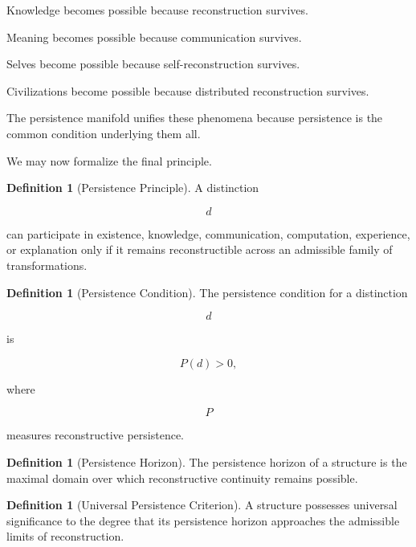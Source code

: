\documentclass[12pt,oneside]{article}
\theoremstyle{definition}
\newtheorem{definition}[theorem]{Definition} \newtheorem{axiom}[theorem]{Axiom} \newtheorem{remark}[theorem]{Remark} \newtheorem{example}[theorem]{Example}
\begin{document}
Knowledge becomes possible because reconstruction survives.

Meaning becomes possible because communication survives.

Selves become possible because self-reconstruction survives.

Civilizations become possible because distributed reconstruction survives.

The persistence manifold unifies these phenomena because persistence is the common condition underlying them all.

We may now formalize the final principle.

\begin{definition}[Persistence Principle]

A distinction

\[
d
\]

can participate in existence, knowledge, communication, computation, experience, or explanation only if it remains reconstructible across an admissible family of transformations.

\end{definition}

\begin{definition}[Persistence Condition]

The persistence condition for a distinction

\[
d
\]

is

\[
P(d) > 0,
\]

where

\[
P
\]

measures reconstructive persistence.

\end{definition}

\begin{definition}[Persistence Horizon]

The persistence horizon of a structure is the maximal domain over which reconstructive continuity remains possible.

\end{definition}

\begin{definition}[Universal Persistence Criterion]

A structure possesses universal significance to the degree that its persistence horizon approaches the admissible limits of reconstruction.

\end{definition}
\end{document}
